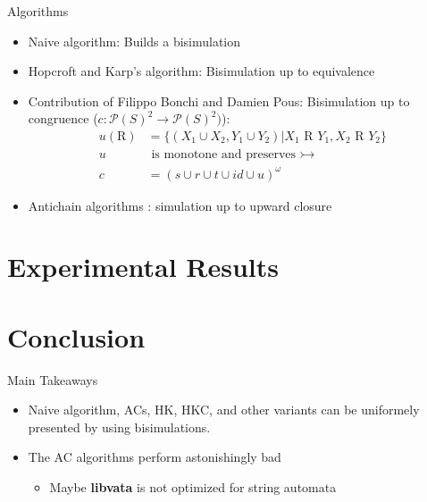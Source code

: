 \documentclass[compress]{beamer}
\begin{document}
\begin{frame}{Algorithms}
  \begin{itemize}
    \item Naive algorithm: Builds a bisimulation
    \item Hopcroft and Karp's algorithm\cite{hopcroft1971linear}: Bisimulation up to equivalence
    \item Contribution of Filippo Bonchi and Damien Pous\cite{bonchi2013checking}:
      Bisimulation up to congruence ($c : \mathcal{P}(S)^2 \to \mathcal{P}(S)^2)$):\\
        \begin{align}
          u(\text{R}) &= \{(X_1 \cup X_2, Y_1 \cup Y_2) | X_1 \text{ R } Y_1, X_2 \text{ R } Y_2\}\\
          u&\text{ is monotone and preserves }\rightarrowtail\\
          c &= (s \cup r \cup t \cup id \cup u)^\omega
        \end{align}
    \item Antichain algorithms
      \cite{doyen2010antichain}\cite{abdulla2010simulation}\cite{lengal2012vata}:
      simulation up to upward closure
  \end{itemize}
\end{frame}

\section{Experimental Results}

\section{Conclusion}

\begin{frame}{Main Takeaways}
  \begin{itemize}
    \item Naive algorithm, ACs, HK, HKC, and other variants can be uniformely
      presented by using bisimulations.
    \item The AC algorithms perform astonishingly bad
      \begin{itemize}
        \item Maybe \textbf{libvata} is not optimized for string automata
      \end{itemize}
  \end{itemize}
\end{frame}
\end{document}
